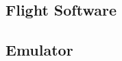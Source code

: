 \documentclass[../report.tex]{subfiles}
\begin{document}
\subsection{Flight Software}


\subsection{Emulator}


\end{document}
